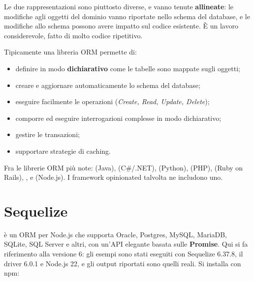 Le due rappresentazioni sono piuttosto diverse, e vanno tenute
\textbf{allineate}: le modifiche agli oggetti del dominio vanno riportate nello
schema del database, e le modifiche allo schema possono avere impatto sul codice
esistente. È un lavoro considerevole, fatto di molto codice ripetitivo.


Tipicamente una libreria ORM permette di:

\begin{itemize}
  \item definire in modo \textbf{dichiarativo} come le tabelle sono mappate
        sugli oggetti;
  \item creare e aggiornare automaticamente lo schema del database;
  \item eseguire facilmente le operazioni  (\textit{Create, Read,
        Update, Delete});
  \item comporre ed eseguire interrogazioni complesse in modo dichiarativo;
  \item gestire le transazioni;
  \item supportare strategie di caching.
\end{itemize}

Fra le librerie ORM più note:  (Java), 
(C\#/.NET),  (Python),  (PHP),  (Ruby on Rails), ,  e 
(Node.js). I framework opinionated talvolta ne includono uno.

\section{Sequelize}

 è un ORM per Node.js che supporta Oracle, Postgres, MySQL,
MariaDB, SQLite, SQL Server e altri, con un'API elegante basata sulle
\textbf{Promise}. Qui si fa riferimento alla versione 6: gli esempi sono stati
eseguiti con Sequelize 6.37.8, il driver  6.0.1 e Node.js 22, e
gli output riportati sono quelli reali. Si installa con npm:

